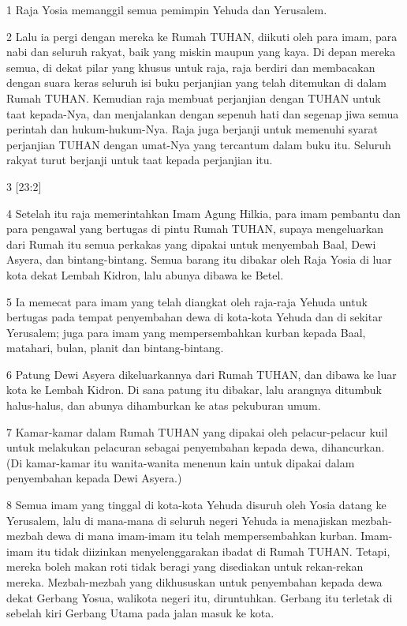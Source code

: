 \par 1 Raja Yosia memanggil semua pemimpin Yehuda dan Yerusalem.
\par 2 Lalu ia pergi dengan mereka ke Rumah TUHAN, diikuti oleh para imam, para nabi dan seluruh rakyat, baik yang miskin maupun yang kaya. Di depan mereka semua, di dekat pilar yang khusus untuk raja, raja berdiri dan membacakan dengan suara keras seluruh isi buku perjanjian yang telah ditemukan di dalam Rumah TUHAN. Kemudian raja membuat perjanjian dengan TUHAN untuk taat kepada-Nya, dan menjalankan dengan sepenuh hati dan segenap jiwa semua perintah dan hukum-hukum-Nya. Raja juga berjanji untuk memenuhi syarat perjanjian TUHAN dengan umat-Nya yang tercantum dalam buku itu. Seluruh rakyat turut berjanji untuk taat kepada perjanjian itu.
\par 3 [23:2]
\par 4 Setelah itu raja memerintahkan Imam Agung Hilkia, para imam pembantu dan para pengawal yang bertugas di pintu Rumah TUHAN, supaya mengeluarkan dari Rumah itu semua perkakas yang dipakai untuk menyembah Baal, Dewi Asyera, dan bintang-bintang. Semua barang itu dibakar oleh Raja Yosia di luar kota dekat Lembah Kidron, lalu abunya dibawa ke Betel.
\par 5 Ia memecat para imam yang telah diangkat oleh raja-raja Yehuda untuk bertugas pada tempat penyembahan dewa di kota-kota Yehuda dan di sekitar Yerusalem; juga para imam yang mempersembahkan kurban kepada Baal, matahari, bulan, planit dan bintang-bintang.
\par 6 Patung Dewi Asyera dikeluarkannya dari Rumah TUHAN, dan dibawa ke luar kota ke Lembah Kidron. Di sana patung itu dibakar, lalu arangnya ditumbuk halus-halus, dan abunya dihamburkan ke atas pekuburan umum.
\par 7 Kamar-kamar dalam Rumah TUHAN yang dipakai oleh pelacur-pelacur kuil untuk melakukan pelacuran sebagai penyembahan kepada dewa, dihancurkan. (Di kamar-kamar itu wanita-wanita menenun kain untuk dipakai dalam penyembahan kepada Dewi Asyera.)
\par 8 Semua imam yang tinggal di kota-kota Yehuda disuruh oleh Yosia datang ke Yerusalem, lalu di mana-mana di seluruh negeri Yehuda ia menajiskan mezbah-mezbah dewa di mana imam-imam itu telah mempersembahkan kurban. Imam-imam itu tidak diizinkan menyelenggarakan ibadat di Rumah TUHAN. Tetapi, mereka boleh makan roti tidak beragi yang disediakan untuk rekan-rekan mereka. Mezbah-mezbah yang dikhususkan untuk penyembahan kepada dewa dekat Gerbang Yosua, walikota negeri itu, diruntuhkan. Gerbang itu terletak di sebelah kiri Gerbang Utama pada jalan masuk ke kota.
